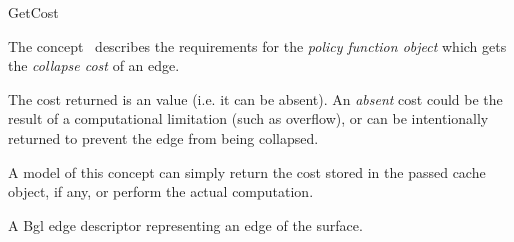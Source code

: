 
\begin{ccRefConcept}{GetCost}


\ccDefinition

The concept \ccRefName\ describes the requirements for the {\em policy function object} which gets the {\em collapse cost} of an edge.

The cost returned is an  value (i.e. it can be absent). An {\em absent} cost could be the result of a computational limitation (such as overflow), or can be intentionally returned to prevent the edge from being collapsed.

A model of this concept can simply return the cost stored in the
passed cache object, if any, or perform the actual computation.

\ccRefines
{}

\ccTypes
\ccGlue    
\ccGlue    
\ccGlue    
  {A {\sc Bgl} edge descriptor representing an edge of the surface.}
\ccGlue    

\ccCreation
{}  %



\end{ccRefConcept}
